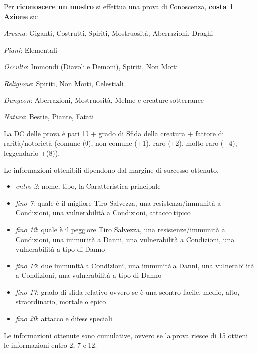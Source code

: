 \documentclass[landscape,10pt,a4paper]{article}
\begin{document}
\begin{multicols}{3}
\begin{dmbox}[title=Riconoscere i mostri - pagina \pageref{riconosceremostro}]

Per \textbf{riconoscere un mostro} si effettua una prova di Conoscenza, \textbf{costa 1 Azione} su:

\medskip

\emph{Arcana}: Giganti, Costrutti, Spiriti, Mostruosità, Aberrazioni, Draghi

\emph{Piani}: Elementali

\emph{Occulto}: Immondi (Diavoli e Demoni), Spiriti, Non Morti

\emph{Religione}: Spiriti, Non Morti, Celestiali

\emph{Dungeon}: Aberrazioni, Mostruosità, Melme e creature sotterranee

\emph{Natura}: Bestie, Piante, Fatati

\medskip

La DC delle prova è pari 10 + grado di Sfida della creatura + fattore di rarità/notorietà (comune (0), non comune (+1), raro (+2), molto raro (+4), leggendario +(8)).

Le informazioni ottenibili dipendono dal margine di successo ottenuto. 

\noindent\begin{itemize}\setlength{\itemsep}{0pt}
\item \emph{entro 2}: nome, tipo, la Caratteristica principale
\item \emph{fino 7}: quale è il migliore Tiro Salvezza, una resistenza/immunità a Condizioni, una vulnerabilità a Condizioni, attacco tipico
\item \emph{fino 12}: quale è il peggiore Tiro Salvezza, una resistenze/immunità a Condizioni, una immunità a Danni, una vulnerabilità a Condizioni, una vulnerabilità a tipo di Danno
\item \emph{fino 15}: due immunità a Condizioni, una immunità a Danni, una vulnerabilità a Condizioni, una vulnerabilità a tipo di Danno
\item \emph{fino 17}: grado di sfida relativo ovvero se è una scontro facile, medio, alto, straordinario, mortale o epico
\item \emph{fino 20}: attacco e difese speciali
\end{itemize}

\medskip

Le informazioni ottenute sono cumulative, ovvero se la prova riesce di 15 ottieni le informazioni entro 2, 7 e 12.
\end{dmbox}



\end{multicols}
\end{document}
